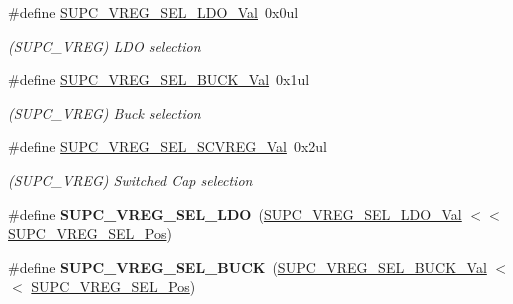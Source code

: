 \begin{DoxyCompactItemize}
\item 
\hypertarget{group___s_a_m_l21___s_u_p_c_gab56bc9d465d19632b2e4f93f09276909}{}\#define \hyperlink{group___s_a_m_l21___s_u_p_c_gab56bc9d465d19632b2e4f93f09276909}{S\+U\+P\+C\+\_\+\+V\+R\+E\+G\+\_\+\+S\+E\+L\+\_\+\+L\+D\+O\+\_\+\+Val}~0x0ul\label{group___s_a_m_l21___s_u_p_c_gab56bc9d465d19632b2e4f93f09276909}

\begin{DoxyCompactList}\small\item\em (S\+U\+P\+C\+\_\+\+V\+R\+E\+G) L\+D\+O selection \end{DoxyCompactList}\item 
\hypertarget{group___s_a_m_l21___s_u_p_c_ga9dfc17663996e43efccd747abb491ceb}{}\#define \hyperlink{group___s_a_m_l21___s_u_p_c_ga9dfc17663996e43efccd747abb491ceb}{S\+U\+P\+C\+\_\+\+V\+R\+E\+G\+\_\+\+S\+E\+L\+\_\+\+B\+U\+C\+K\+\_\+\+Val}~0x1ul\label{group___s_a_m_l21___s_u_p_c_ga9dfc17663996e43efccd747abb491ceb}

\begin{DoxyCompactList}\small\item\em (S\+U\+P\+C\+\_\+\+V\+R\+E\+G) Buck selection \end{DoxyCompactList}\item 
\hypertarget{group___s_a_m_l21___s_u_p_c_gaa17ad97cd23fced053de56b11a02c09e}{}\#define \hyperlink{group___s_a_m_l21___s_u_p_c_gaa17ad97cd23fced053de56b11a02c09e}{S\+U\+P\+C\+\_\+\+V\+R\+E\+G\+\_\+\+S\+E\+L\+\_\+\+S\+C\+V\+R\+E\+G\+\_\+\+Val}~0x2ul\label{group___s_a_m_l21___s_u_p_c_gaa17ad97cd23fced053de56b11a02c09e}

\begin{DoxyCompactList}\small\item\em (S\+U\+P\+C\+\_\+\+V\+R\+E\+G) Switched Cap selection \end{DoxyCompactList}\item 
\hypertarget{group___s_a_m_l21___s_u_p_c_gae1cc290d4cb47348e2e8145d1ad5b0bc}{}\#define {\bfseries S\+U\+P\+C\+\_\+\+V\+R\+E\+G\+\_\+\+S\+E\+L\+\_\+\+L\+D\+O}~(\hyperlink{group___s_a_m_l21___s_u_p_c_gab56bc9d465d19632b2e4f93f09276909}{S\+U\+P\+C\+\_\+\+V\+R\+E\+G\+\_\+\+S\+E\+L\+\_\+\+L\+D\+O\+\_\+\+Val}         $<$$<$ \hyperlink{group___s_a_m_l21___s_u_p_c_gaef51119ae72407e4a6761def82082aad}{S\+U\+P\+C\+\_\+\+V\+R\+E\+G\+\_\+\+S\+E\+L\+\_\+\+Pos})\label{group___s_a_m_l21___s_u_p_c_gae1cc290d4cb47348e2e8145d1ad5b0bc}

\item 
\hypertarget{group___s_a_m_l21___s_u_p_c_gac28fb9d9d6737b04e66bb5a99902159a}{}\#define {\bfseries S\+U\+P\+C\+\_\+\+V\+R\+E\+G\+\_\+\+S\+E\+L\+\_\+\+B\+U\+C\+K}~(\hyperlink{group___s_a_m_l21___s_u_p_c_ga9dfc17663996e43efccd747abb491ceb}{S\+U\+P\+C\+\_\+\+V\+R\+E\+G\+\_\+\+S\+E\+L\+\_\+\+B\+U\+C\+K\+\_\+\+Val}        $<$$<$ \hyperlink{group___s_a_m_l21___s_u_p_c_gaef51119ae72407e4a6761def82082aad}{S\+U\+P\+C\+\_\+\+V\+R\+E\+G\+\_\+\+S\+E\+L\+\_\+\+Pos})\label{group___s_a_m_l21___s_u_p_c_gac28fb9d9d6737b04e66bb5a99902159a}


\end{DoxyCompactItemize}
